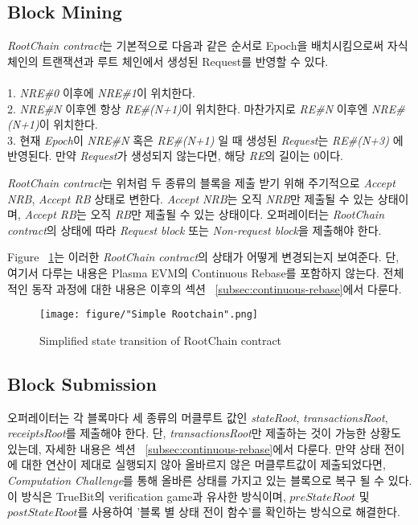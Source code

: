 \documentclass[letterpaper, 11pt]{article}
\begin{document}
\subsection{Block Mining} \label{subsec:blockmining}
\begin{CJK}{UTF8}{mj}
\emph{RootChain contract}는 기본적으로 다음과 같은 순서로 Epoch을 배치시킴으로써 자식 체인의 트랜잭션과 루트 체인에서 생성된 Request를 반영할 수 있다.\\
\\
1. \emph{NRE\#0} 이후에 \emph{NRE\#1}이 위치한다.\\
2. \emph{NRE\#N} 이후엔 항상 \emph{RE\#(N+1)}이 위치한다. 마찬가지로 \emph{RE\#N} 이후엔 \emph{NRE\#(N+1)}이 위치한다.\\
3. 현재 \emph{Epoch}이 \emph{NRE\#N} 혹은 \emph{RE\#(N+1)} 일 때 생성된 \emph{Request}는 \emph{RE\#(N+3)} 에 반영된다. 만약 \emph{Request}가 생성되지 않는다면, 해당 \emph{RE}의 길이는 0이다.

\bigskip

\emph{RootChain contract}는 위처럼 두 종류의 블록을 제출 받기 위해 주기적으로 \emph{Accept NRB}, \emph{Accept RB} 상태로 변한다. \emph{Accept NRB}는 오직 \emph{NRB}만 제출될 수 있는 상태이며, \emph{Accept RB}는 오직 \emph{RB}만 제출될 수 있는 상태이다. 오퍼레이터는 \emph{RootChain contract}의 상태에 따라 \emph{Request block} 또는 \emph{Non-request block}을 제출해야 한다.

Figure ~\ref{fig:simple-state-transition-diagram}는 이러한 \emph{RootChain contract}의 상태가 어떻게 변경되는지 보여준다. 단, 여기서 다루는 내용은 Plasma EVM의 Continuous Rebase를 포함하지 않는다. 전체적인 동작 과정에 대한 내용은 이후의 섹션 ~\ref{subsec:continuous-rebase}에서 다룬다.

\begin{figure}[!h]
\centering
\texttt{[image: figure/"Simple Rootchain".png]}
\caption{Simplified state transition of RootChain contract}
\label{fig:simple-state-transition-diagram}
\end{figure}

\end{CJK}

\subsection{Block Submission}
\begin{CJK}{UTF8}{mj}
오퍼레이터는 각 블록마다 세 종류의 머클루트 값인 \emph{stateRoot}, \emph{transactionsRoot}, \emph{receiptsRoot}를 제출해야 한다. 단, \emph{transactionsRoot}만 제출하는 것이 가능한 상황도 있는데, 자세한 내용은 섹션 ~\ref{subsec:continuous-rebase}에서 다룬다. 만약 상태 전이에 대한 연산이 제대로 실행되지 않아 올바르지 않은 머클루트값이 제출되었다면, \emph{Computation Challenge}를 통해 올바른 상태를 가지고 있는 블록으로 복구 될 수 있다. 이 방식은 TrueBit의 verification game과 유사한 방식이며, $preStateRoot$ 및 $postStateRoot$를 사용하여 '블록 별 상태 전이 함수'를 확인하는 방식으로 해결한다.
\end{CJK}
\end{document}
